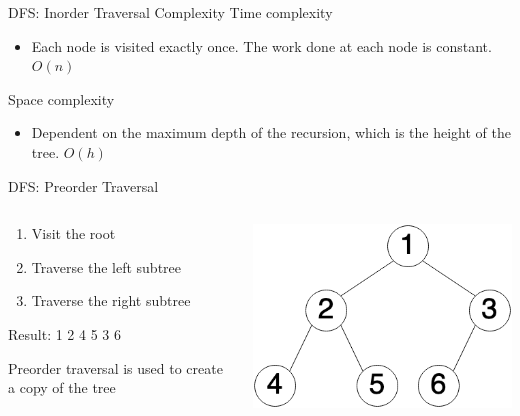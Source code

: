 \documentclass[
  ignorenonframetext,
]{beamer}
\providecommand{\tightlist}{%
  \setlength{\itemsep}{0pt}\setlength{\parskip}{0pt}}\usepackage{longtable,booktabs,array}
\begin{document}
\begin{frame}{DFS: Inorder Traversal Complexity}
\protect\hypertarget{dfs-inorder-traversal-complexity}{}
Time complexity

\begin{itemize}
\tightlist
\item
  Each node is visited exactly once. The work done at each node is
  constant. \(O(n)\)
\end{itemize}

Space complexity

\begin{itemize}
\tightlist
\item
  Dependent on the maximum depth of the recursion, which is the height
  of the tree. \(O(h)\)
\end{itemize}
\end{frame}

\begin{frame}{DFS: Preorder Traversal}
\protect\hypertarget{dfs-preorder-traversal}{}
\begin{columns}[T]
\begin{column}{0.6\textwidth}
\begin{enumerate}
\item
  Visit the root
\item
  Traverse the left subtree
\item
  Traverse the right subtree
\end{enumerate}

\vspace{1cm}

Result: 1 2 4 5 3 6

Preorder traversal is used to create a copy of the tree
\end{column}

\begin{column}{0.4\textwidth}
\includegraphics{images/tree-num.png}
\end{column}
\end{columns}
\end{frame}
\end{document}
